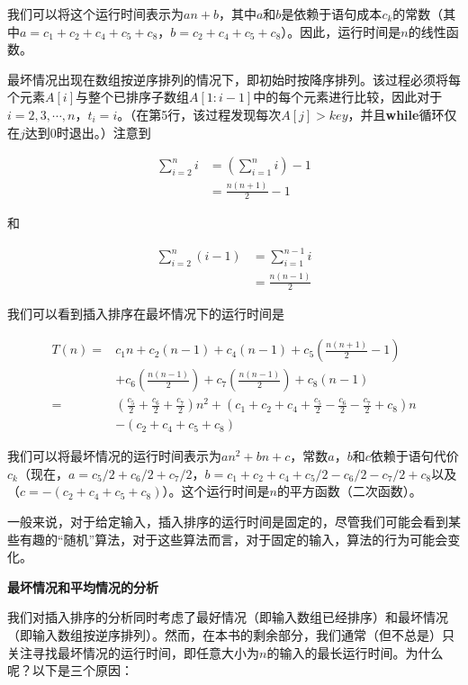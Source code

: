 \documentclass[lang=cn,newtx,10pt,scheme=chinese]{elegantbook}
\begin{document}
我们可以将这个运行时间表示为$an+b$，其中$a$和$b$是依赖于语句成本$c_k$的常数（其中$a=c_1+c_2+c_4+c_5+c_8$，$b=c_2+c_4+c_5+c_8$）。因此，运行时间是$n$的线性函数。

最坏情况出现在数组按逆序排列的情况下，即初始时按降序排列。该过程必须将每个元素$A[i]$与整个已排序子数组$A[1:i-1]$中的每个元素进行比较，因此对于$i=2,3,\cdots,n$，$t_i=i$。（在第5行，该过程发现每次$A[j] > key$，并且\textbf{while}循环仅在$j$达到0时退出。）注意到

\begin{equation*}
\begin{aligned}
\sum_{i=2}^n i & =(\sum_{i=1}^n i)-1 \\
& =\frac{n(n+1)}{2}-1
\end{aligned}
\end{equation*}

和

\begin{equation*}
\begin{aligned}
\sum_{i=2}^n(i-1) & =\sum_{i=1}^{n-1} i \\
& =\frac{n(n-1)}{2}
\end{aligned}
\end{equation*}

我们可以看到插入排序在最坏情况下的运行时间是

\begin{equation}\label{eq:2.2}
\begin{aligned}
T(n)= & c_1 n+c_2(n-1)+c_4(n-1)+c_5(\frac{n(n+1)}{2}-1) \\
& +c_6(\frac{n(n-1)}{2})+c_7(\frac{n(n-1)}{2})+c_8(n-1) \\
= & (\frac{c_5}{2}+\frac{c_6}{2}+\frac{c_7}{2}) n^2+(c_1+c_2+c_4+\frac{c_5}{2}-\frac{c_6}{2}-\frac{c_7}{2}+c_8) n \\
& -(c_2+c_4+c_5+c_8)
\end{aligned}
\end{equation}

我们可以将最坏情况的运行时间表示为$an^2+bn+c$，常数$a$，$b$和$c$依赖于语句代价$c_k$（现在，$a=c_5/2+c_6/2+c_7/2$，$b=c_1+c_2+c_4+c_5/2-c_6/2-c_7/2+c_8$以及（$c=-(c_2+c_4+c_5+c_8)$）。这个运行时间是$n$的平方函数（二次函数）。

一般来说，对于给定输入，插入排序的运行时间是固定的，尽管我们可能会看到某些有趣的``随机''算法，对于这些算法而言，对于固定的输入，算法的行为可能会变化。

\textbf{最坏情况和平均情况的分析}

我们对插入排序的分析同时考虑了最好情况（即输入数组已经排序）和最坏情况（即输入数组按逆序排列）。然而，在本书的剩余部分，我们通常（但不总是）只关注寻找最坏情况的运行时间，即任意大小为$n$的输入的最长运行时间。为什么呢？以下是三个原因：
\end{document}
